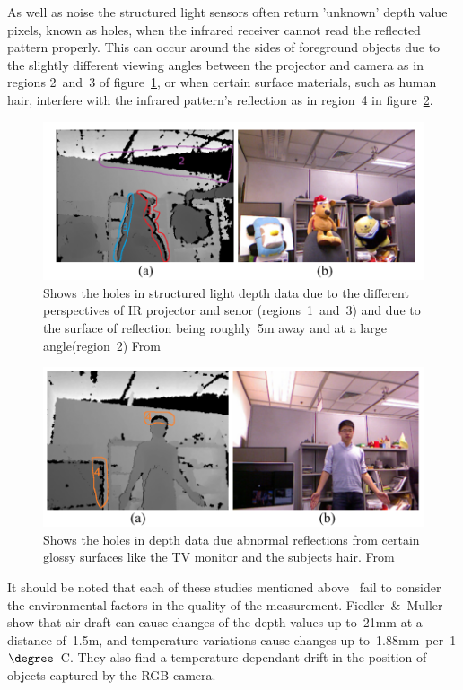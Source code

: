 \documentclass[11pt]{article} %
\begin{document}
As well as noise the structured light sensors often return 'unknown' depth value pixels, known as holes, when the infrared receiver cannot read the reflected pattern properly. This can occur around the sides of foreground objects due to the slightly different viewing angles between the projector and camera as in regions 2~and~3 of figure~\ref{fig:kinectHoles4}, or when certain surface materials, such as human hair, interfere with the infrared pattern's reflection as in region~4 in figure~\ref{fig:kinectHoles3}. 
 \begin{figure}
\includegraphics*[width=1\linewidth,clip,trim={1cm 1.5cm 1cm 1cm}]{kinectHoles4}
\caption{Shows the holes in structured light depth data due to the different perspectives of IR projector and senor (regions~1~and~3) and due to the surface of reflection being roughly~5m away and at a large angle(region~2) From~\cite{Feng2013}		\label{fig:kinectHoles4}  } 
\end{figure}
 \begin{figure}
\includegraphics*[width=1\linewidth,clip,trim={1cm 1.5cm 1cm 1cm}]{kinectHoles3}
\caption{Shows the holes in depth data due abnormal reflections from certain glossy surfaces like the TV monitor and the subjects hair.  From~\cite{Feng2013}			\label{fig:kinectHoles3}  } 
\end{figure}

It should be noted that each of these studies mentioned above~\cite{Khoshelham2012a,Smisek2011,Nguyen2012} fail to consider the environmental factors in the quality of the measurement. Fiedler~\&~Muller \cite{Fiedler2013} show that air draft can cause changes of the depth values up to~21mm at a distance of~1.5m, and temperature variations cause changes up to~1.88mm~per~1$\degree$~C. They also find a temperature dependant drift in the position of objects captured by the RGB camera.
\end{document}
